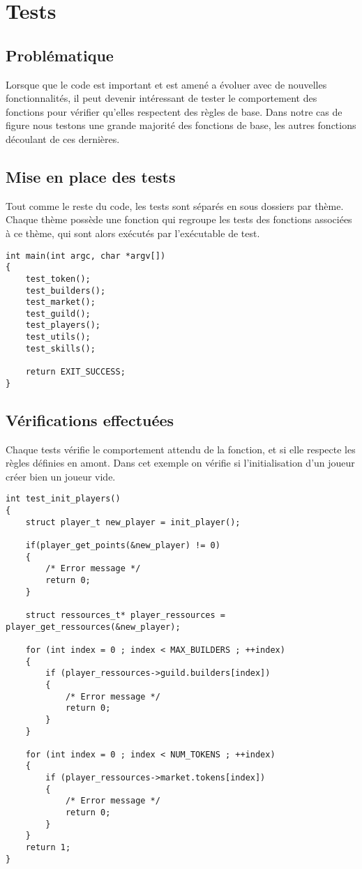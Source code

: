 \section{Tests}
\label{tests}

\subsection*{Problématique}

Lorsque que le code est important et est amené a évoluer avec de nouvelles fonctionnalités, il peut devenir intéressant de tester le comportement des fonctions pour vérifier qu'elles respectent des règles de base. Dans notre cas de figure nous testons une grande majorité des fonctions de base, les autres fonctions découlant de ces dernières.

\subsection{Mise en place des tests}

Tout comme le reste du code, les tests sont séparés en sous dossiers par thème. Chaque thème possède une fonction qui regroupe les tests des fonctions associées à ce thème, qui sont alors exécutés par l'exécutable de test.


\begin{lstlisting}[frame=single, caption={Exécution des tests}]
int main(int argc, char *argv[])
{
	test_token();
	test_builders();
	test_market();
	test_guild();
	test_players();
	test_utils();
	test_skills();
 
	return EXIT_SUCCESS;
}
\end{lstlisting}

\subsection{Vérifications effectuées}

Chaque tests vérifie le comportement attendu de la fonction, et si elle respecte les règles définies en amont. Dans cet exemple on vérifie si l'initialisation d'un joueur créer bien un joueur vide.

\begin{lstlisting}[frame=single, caption={Test init player}]
int test_init_players()
{
	struct player_t new_player = init_player();

	if(player_get_points(&new_player) != 0)
	{
		/* Error message */
		return 0;
	}

	struct ressources_t* player_ressources = player_get_ressources(&new_player);
	
	for (int index = 0 ; index < MAX_BUILDERS ; ++index)
	{
		if (player_ressources->guild.builders[index]) 
		{
			/* Error message */
			return 0;
		}
	}

	for (int index = 0 ; index < NUM_TOKENS ; ++index)
	{
		if (player_ressources->market.tokens[index]) 
		{
			/* Error message */
			return 0;
		}
	}
	return 1;
}
\end{lstlisting}